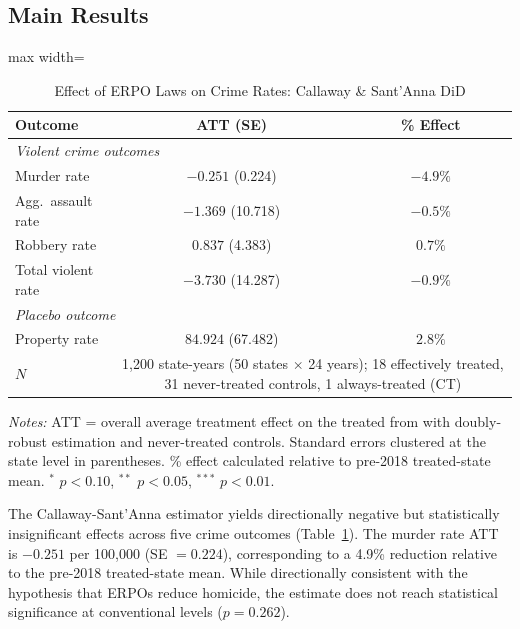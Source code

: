 \documentclass[12pt]{article}
\begin{document}
\subsection{Main Results}

\begin{table}[H]
\centering
\caption{Effect of ERPO Laws on Crime Rates: Callaway \& Sant'Anna DiD}
\label{tab:main}
\begin{adjustbox}{max width=\textwidth}
\begin{threeparttable}
\begin{tabular}{lcc}
\toprule
Outcome & ATT (SE) & \% Effect \\
\midrule
\multicolumn{3}{l}{\textit{Violent crime outcomes}} \\
\quad Murder rate & $-0.251$ (0.224) & $-4.9\%$ \\
\quad Agg.\ assault rate & $-1.369$ (10.718) & $-0.5\%$ \\
\quad Robbery rate & $0.837$ (4.383) & $0.7\%$ \\
\quad Total violent rate & $-3.730$ (14.287) & $-0.9\%$ \\
\midrule
\multicolumn{3}{l}{\textit{Placebo outcome}} \\
\quad Property rate & $84.924$ (67.482) & $2.8\%$ \\
\midrule
$N$ & \multicolumn{2}{c}{1,200 state-years (50 states $\times$ 24 years); 18 effectively treated, 31 never-treated controls, 1 always-treated (CT)} \\
\bottomrule
\end{tabular}
\begin{tablenotes}[flushleft]
\small
\item \textit{Notes:} ATT = overall average treatment effect on the treated from \citet{callaway2021difference} with doubly-robust estimation and never-treated controls. Standard errors clustered at the state level in parentheses. \% effect calculated relative to pre-2018 treated-state mean. $^{*}$ $p<0.10$, $^{**}$ $p<0.05$, $^{***}$ $p<0.01$.
\end{tablenotes}
\end{threeparttable}
\end{adjustbox}
\end{table}

The Callaway-Sant'Anna estimator yields directionally negative but statistically insignificant effects across five crime outcomes (Table~\ref{tab:main}). The murder rate ATT is $-0.251$ per 100,000 (SE $= 0.224$), corresponding to a 4.9\% reduction relative to the pre-2018 treated-state mean. While directionally consistent with the hypothesis that ERPOs reduce homicide, the estimate does not reach statistical significance at conventional levels ($p = 0.262$).
\end{document}
